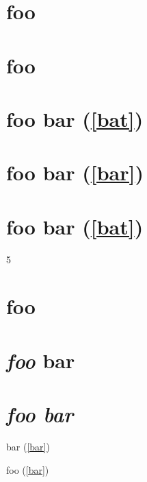 
\def\mytitle{Advanced Headers}


\part{foo}
\label{bar}

\part{foo}
\label{bar}

\part{foo bar (\autoref{bat})}
\label{foobarbat}

\part{foo bar (\autoref{bar})}
\label{bat}

\part{foo bar (\autoref{bat})}
\label{baz}

5

\part{foo}
\label{bar}

\part{\emph{foo} bar}
\label{foobar}

\part{\emph{foo
bar}}
\label{foobar}

bar (\autoref{bar})

foo (\autoref{bar})



